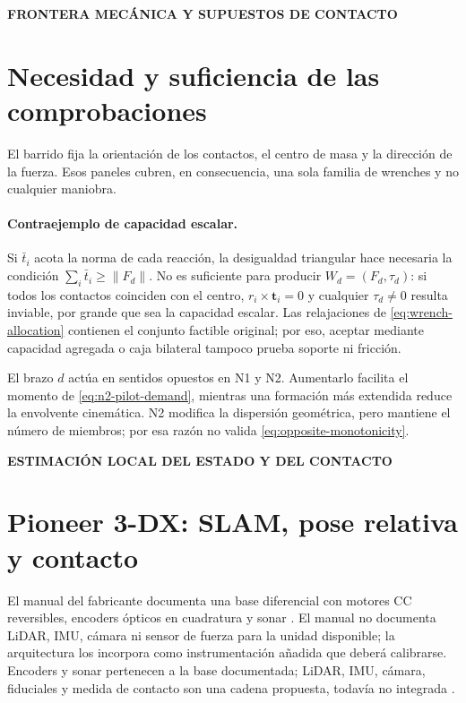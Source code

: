 \documentclass[12pt,a4paper]{article}
\newcommand{\leveltag}[1]{%
  \Needspace{5.5\baselineskip}%
  \noindent\colorbox{VIUDark}{%
    \parbox{\dimexpr\textwidth-2\fboxsep\relax}{%
      \color{white}\sffamily\bfseries\small #1%
    }%
  }\par\smallskip
}
\begin{document}
\leveltag{FRONTERA MECÁNICA Y SUPUESTOS DE CONTACTO}
\section*{Necesidad y suficiencia de las comprobaciones}

El barrido fija la orientación de los contactos, el centro de masa y la dirección
de la fuerza. Esos paneles cubren, en consecuencia, una sola
familia de wrenches y no cualquier maniobra.

\paragraph{Contraejemplo de capacidad escalar.}
Si $\bar t_i$ acota la norma de cada reacción, la desigualdad triangular hace
necesaria la condición $\sum_i\bar t_i\geq\|F_d\|$. No es suficiente para
producir $W_d=(F_d,\tau_d)$: si todos los contactos coinciden con el centro,
$r_i\times\mathbf t_i=0$ y cualquier $\tau_d\neq0$ resulta inviable, por grande
que sea la capacidad escalar. Las relajaciones de
\eqref{eq:wrench-allocation} contienen el conjunto factible original; por eso,
aceptar mediante capacidad agregada o caja bilateral tampoco prueba soporte ni
fricción.

El brazo $d$ actúa en sentidos opuestos en N1 y N2. Aumentarlo facilita el
momento de \eqref{eq:n2-pilot-demand}, mientras una formación más extendida
reduce la envolvente cinemática. N2 modifica la dispersión geométrica, pero
mantiene el número de miembros; por esa razón no valida
\eqref{eq:opposite-monotonicity}.

\leveltag{ESTIMACIÓN LOCAL DEL ESTADO Y DEL CONTACTO}
\section*{Pioneer 3-DX: SLAM, pose relativa y contacto}

El manual del fabricante documenta una base diferencial con motores CC
reversibles, encoders ópticos en cuadratura y sonar
\parencite{activmedia2003pioneer}. El manual no documenta LiDAR, IMU, cámara ni
sensor de fuerza para la unidad disponible; la arquitectura los incorpora como
instrumentación añadida que deberá calibrarse. Encoders y sonar pertenecen a la
base documentada; LiDAR, IMU, cámara, fiduciales y medida de contacto son una
cadena propuesta, todavía no integrada \parencite{olson2011apriltag}.
\end{document}
